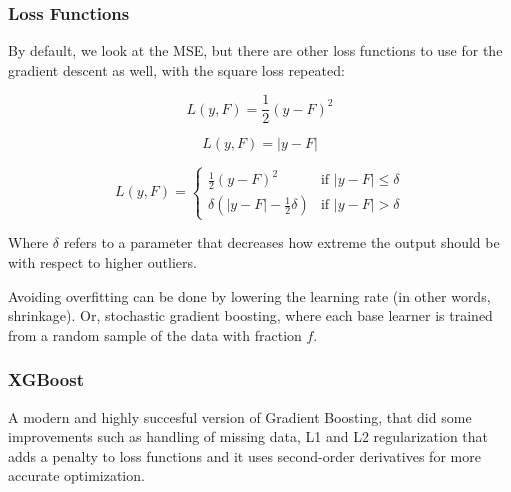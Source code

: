 \subsubsection{Loss Functions}

By default, we look at the MSE, but there are other loss functions to use for
the gradient descent as well, with the square loss repeated:

\begin{definition}
  \begin{displaymath}
    L(y, F) = \frac{1}{2} (y - F)^2
  \end{displaymath}
\end{definition}

\begin{definition}
  \begin{displaymath}
    L(y, F) = \left| y - F \right|
  \end{displaymath}
\end{definition}

\begin{definition}
  \begin{displaymath} L(y, F) =
    \begin{cases}
      \frac{1}{2} (y - F)^2 & \text{if } |y - F| \leq
      \delta \\
      \delta \left( |y - F| - \frac{1}{2} \delta \right) &
      \text{if } |y - F| > \delta
    \end{cases}
  \end{displaymath}

  Where $\delta$ refers to a parameter that decreases how
  extreme the output should be with respect to higher
  outliers.
\end{definition}

Avoiding overfitting can be done by lowering the learning rate
(in other words, shrinkage). Or, stochastic gradient boosting,
where each base learner is trained from a random sample of the
data with fraction $f$.

\subsubsection{XGBoost}

A modern and highly succesful version of Gradient Boosting,
that did some improvements such as handling of missing data,
L1 and L2 regularization that adds a penalty to loss functions
and it uses second-order derivatives for more accurate
optimization.
